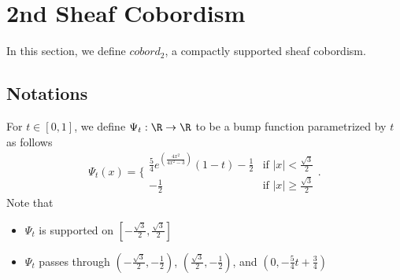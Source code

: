 \section{2nd Sheaf Cobordism}
In this section, we define $cobord_2$, a compactly supported sheaf cobordism.
\subsection{Notations}
\begin{definition}
For $t \in [0,1]$, we define $\Psi_t: \R \rightarrow \R$ to be a bump function parametrized by $t$ as follows
\[\Psi_t(x)=\bigg\{
\begin{array}{ll}
    \frac{5}{4}e^{(\frac{4x^2}{4x^2 - 3})}(1-t) - \frac{1}{2} & \text{if } |x| < \frac{\sqrt{3}}{2} \\
    -\frac{1}{2} & \text{if } |x| \geq \frac{\sqrt{3}}{2} 
\end{array}
\bigg.
\]
Note that 
\begin{itemize}
\item $\Psi_t$ is supported on $[-\frac{\sqrt{3}}{2},\frac{\sqrt{3}}{2}]$

\item $\Psi_t$ passes through $(-\frac{\sqrt{3}}{2},-\frac{1}{2})$, $(\frac{\sqrt{3}}{2},-\frac{1}{2})$, and $(0,-\frac{5}{4}t + \frac{3}{4})$
\end{itemize}
\end{definition}
